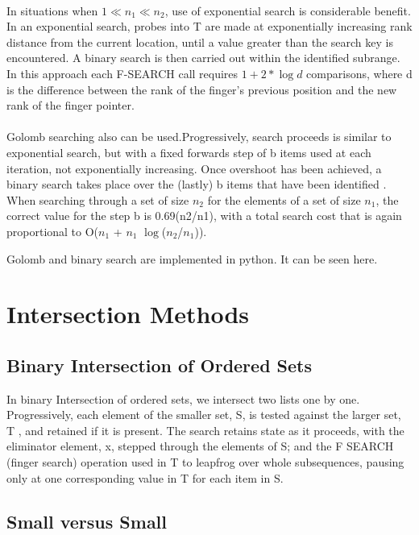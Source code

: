 \documentclass[paper=a4, fontsize=11pt]{scrartcl} %
\numberwithin{equation}{section} %
\numberwithin{figure}{section} %
\numberwithin{table}{section} %
\begin{document}
\paragraph{}
In situations when $1 \ll  n_{1} \ll  n_{2} $, use of exponential search is considerable benefit. In an exponential search, probes into T are made at exponentially increasing rank distance from the current location, until a value greater than the search key is encountered. A binary search is then carried out within the identified subrange. In this approach each F-SEARCH call requires $1+2* \log d$ comparisons, where d is the difference between the rank of the finger's previous position and the new rank of the finger pointer. 

\paragraph{}
Golomb searching also can be used.Progressively, search proceeds is similar to exponential search, but with a fixed forwards step of b items used at each iteration, not exponentially increasing. Once overshoot has been achieved, a binary search takes place over the (lastly) b items that have been identified . When searching through a set of size $n_{2}$ for the elements of a set of size $n_{1}$, the correct value for the step b is 0.69(n2/n1), with a total search cost that is again proportional to O($n_{1}$ + $n_{1}$ $\log$($n_{2}$/$n_{1}$)).

Golomb and binary search are implemented in python. It can be seen here.

\section{Intersection Methods}

\subsection{Binary Intersection of Ordered Sets}
In binary Intersection of ordered sets, we intersect two lists one by one. Progressively,
each element of the smaller set, S, is tested against the larger set, T , and retained if it is present. The search retains state as it proceeds, with the eliminator element, x, stepped through the elements of S; and the F SEARCH (finger search) operation used in T to leapfrog over whole subsequences, pausing only at one corresponding value in T for each item in S. 


\subsection{Small versus Small}
\end{document}
